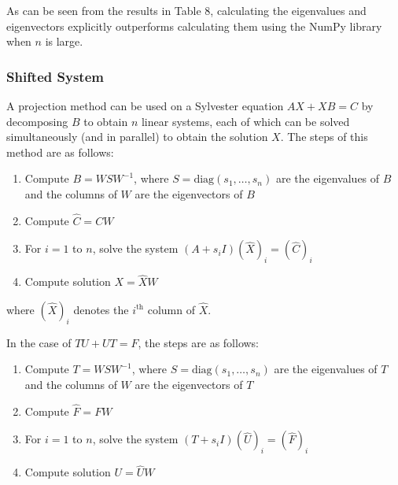 \documentclass{article}
\numberwithin{equation}{section}
\begin{document}
As can be seen from the results in Table 8, calculating the eigenvalues and eigenvectors explicitly  outperforms calculating them using the NumPy library when $n$ is large.

\subsubsection{Shifted System}
A projection method \cite{Simoncini} can be used on a Sylvester equation $AX + XB =C$ by decomposing $B$ to obtain $n$ linear systems, each of which can be solved simultaneously (and in parallel) to obtain the solution $X$. The steps of this method are as follows:
\begin{enumerate}
\item Compute $B = WSW^{-1}$, where $S = \text{diag}(s_1, \dots, s_n)$ are the eigenvalues of $B$ and the columns of $W$ are the eigenvectors of $B$
\item Compute $\hat{C} = CW$
\item For $i=1$ to $n$, solve the system $(A+s_i I)(\hat{X})_i = (\hat{C})_i$
\item Compute solution $X = \hat{X}W$
\end{enumerate}
where $(\hat{X})_i$ denotes the $i^{\text{th}}$ column of $\hat{X}$.

In the case of $TU + UT = F$, the steps are as follows:
\begin{enumerate}
\item Compute $T = WSW^{-1}$, where $S = \text{diag}(s_1, \dots, s_n)$ are the eigenvalues of $T$ and the columns of $W$ are the eigenvectors of $T$
\item Compute $\hat{F} = FW$
\item For $i=1$ to $n$, solve the system $(T+s_i I)(\hat{U})_i = (\hat{F})_i$
\item Compute solution $U = \hat{U}W$
\end{enumerate}
\end{document}
